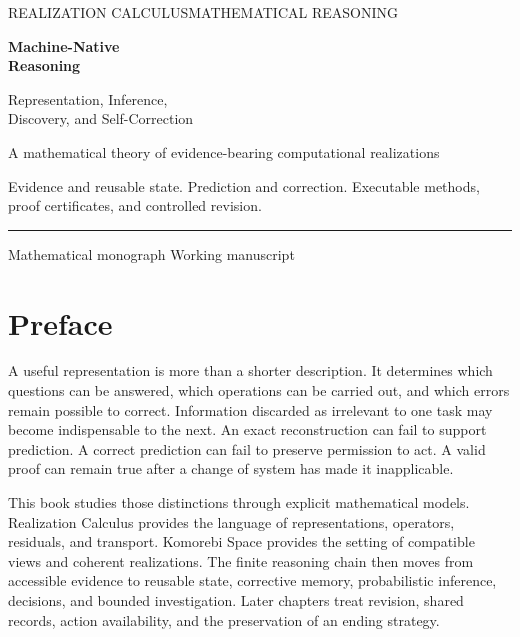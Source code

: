 \documentclass[11pt,oneside,openany]{book}
\theoremstyle{definition}\newtheorem{definition}[theorem]{Definition}
\begin{document}
\frontmatter
\hypersetup{pageanchor=false}
\begin{titlepage}
\thispagestyle{empty}
{\small\scshape REALIZATION CALCULUS\hfill MATHEMATICAL REASONING}\par
\vspace{1.1in}
{\color{Ink}\fontsize{34}{39}\selectfont\bfseries Machine-Native\\[3mm]Reasoning\par}
\vspace{0.30in}
{\fontsize{19}{25}\selectfont Representation, Inference,\\ Discovery, and Self-Correction\par}
\vspace{0.38in}{\color{Accent}\rule{1.9in}{2pt}}\par
\vspace{0.45in}{\Large Komorebi P.\par}
\vfill
{\large A mathematical theory of evidence-bearing computational realizations}\par
\vspace{0.22in}
Evidence and reusable state. Prediction and correction.
Executable methods, proof certificates, and controlled revision.\par
\vspace{0.65in}
{\color{Ink}\rule{\linewidth}{0.7pt}}\par
{\small Mathematical monograph \hfill Working manuscript}
\end{titlepage}
\hypersetup{pageanchor=true}

\chapter*{Preface}
A useful representation is more than a shorter description. It determines which questions can be answered, which operations can be carried out, and which errors remain possible to correct. Information discarded as irrelevant to one task may become indispensable to the next. An exact reconstruction can fail to support prediction. A correct prediction can fail to preserve permission to act. A valid proof can remain true after a change of system has made it inapplicable.

This book studies those distinctions through explicit mathematical models. Realization Calculus provides the language of representations, operators, residuals, and transport. Komorebi Space provides the setting of compatible views and coherent realizations. The finite reasoning chain then moves from accessible evidence to reusable state, corrective memory, probabilistic inference, decisions, and bounded investigation. Later chapters treat revision, shared records, action availability, and the preservation of an ending strategy.
\end{document}
